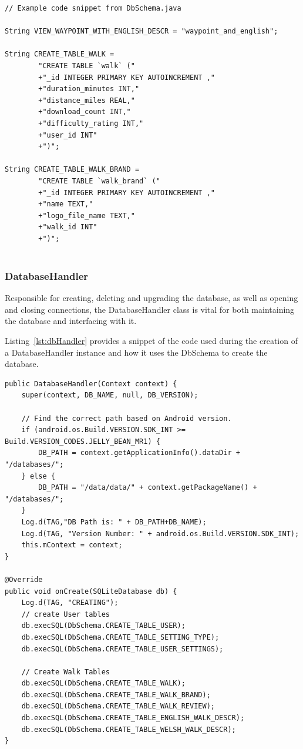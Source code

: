 \documentclass[11pt,a4paper]{article}
\begin{document}
\begin{lstlisting}[captionpos=b, caption=DbSchema Snippet, label=lst:dbSchema, frame=single]
// Example code snippet from DbSchema.java

String VIEW_WAYPOINT_WITH_ENGLISH_DESCR = "waypoint_and_english";

String CREATE_TABLE_WALK = 
		"CREATE TABLE `walk` (" 
		+"_id INTEGER PRIMARY KEY AUTOINCREMENT ,"
		+"duration_minutes INT,"
		+"distance_miles REAL,"
		+"download_count INT,"	
        +"difficulty_rating INT,"
		+"user_id INT"
		+")";
	
String CREATE_TABLE_WALK_BRAND = 
		"CREATE TABLE `walk_brand` ("
		+"_id INTEGER PRIMARY KEY AUTOINCREMENT ,"
		+"name TEXT,"
		+"logo_file_name TEXT,"
        +"walk_id INT"
		+")";
			
\end{lstlisting}

\subsubsection{DatabaseHandler}
Responsible for creating, deleting and upgrading the database, as well as opening and closing connections, the DatabaseHandler class is vital for both maintaining the database and interfacing with it.

Listing~\ref{lst:dbHandler} provides a snippet of the code used during the creation of a DatabaseHandler instance and how it uses the DbSchema to create the database.

\begin{lstlisting}[captionpos=b, caption=DatabaseHandler Snippet, label=lst:dbHandler, frame=single]
public DatabaseHandler(Context context) {
	super(context, DB_NAME, null, DB_VERSION);

    // Find the correct path based on Android version.
    if (android.os.Build.VERSION.SDK_INT >= Build.VERSION_CODES.JELLY_BEAN_MR1) {
        DB_PATH = context.getApplicationInfo().dataDir + "/databases/";
    } else {
        DB_PATH = "/data/data/" + context.getPackageName() + "/databases/";
    }
    Log.d(TAG,"DB Path is: " + DB_PATH+DB_NAME);
    Log.d(TAG, "Version Number: " + android.os.Build.VERSION.SDK_INT);
    this.mContext = context;
}

@Override
public void onCreate(SQLiteDatabase db) {
    Log.d(TAG, "CREATING");
    // create User tables
    db.execSQL(DbSchema.CREATE_TABLE_USER);
    db.execSQL(DbSchema.CREATE_TABLE_SETTING_TYPE);
    db.execSQL(DbSchema.CREATE_TABLE_USER_SETTINGS);

    // Create Walk Tables
    db.execSQL(DbSchema.CREATE_TABLE_WALK);
    db.execSQL(DbSchema.CREATE_TABLE_WALK_BRAND);
    db.execSQL(DbSchema.CREATE_TABLE_WALK_REVIEW);
    db.execSQL(DbSchema.CREATE_TABLE_ENGLISH_WALK_DESCR);
    db.execSQL(DbSchema.CREATE_TABLE_WELSH_WALK_DESCR);
}
\end{lstlisting}
\end{document}
